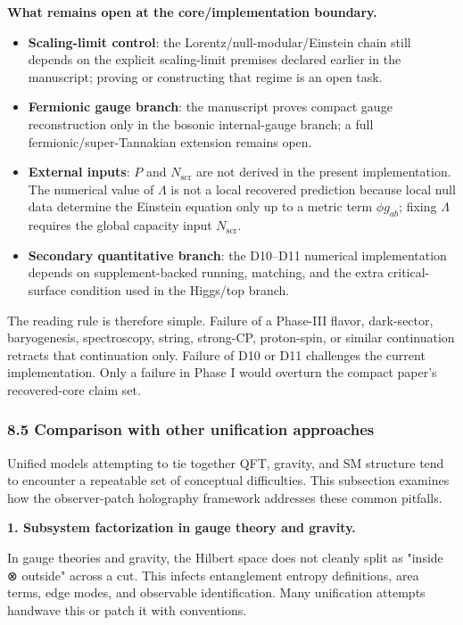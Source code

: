 \textbf{What remains open at the core/implementation boundary.}
\begin{itemize}
\item \textbf{Scaling-limit control}: the Lorentz/null-modular/Einstein chain still depends on the explicit scaling-limit premises declared earlier in the manuscript; proving or constructing that regime is an open task.
\item \textbf{Fermionic gauge branch}: the manuscript proves compact gauge reconstruction only in the bosonic internal-gauge branch; a full fermionic/super-Tannakian extension remains open.
\item \textbf{External inputs}: $P$ and $N_{\mathrm{scr}}$ are not derived in the present implementation. The numerical value of $\Lambda$ is not a local recovered prediction because local null data determine the Einstein equation only up to a metric term $\phi g_{ab}$; fixing $\Lambda$ requires the global capacity input $N_{\mathrm{scr}}$.
\item \textbf{Secondary quantitative branch}: the D10--D11 numerical implementation depends on supplement-backed running, matching, and the extra critical-surface condition used in the Higgs/top branch.
\end{itemize}

The reading rule is therefore simple. Failure of a Phase-III flavor, dark-sector, baryogenesis, spectroscopy, string, strong-CP, proton-spin, or similar continuation retracts that continuation only. Failure of D10 or D11 challenges the current implementation. Only a failure in Phase I would overturn the compact paper's recovered-core claim set.

\subsubsection{8.5 Comparison with other unification approaches}\label{85-comparison-with-other-unification-approaches}

Unified models attempting to tie together QFT, gravity, and SM structure tend to encounter a repeatable set of conceptual difficulties. This subsection examines how the observer-patch holography framework addresses these common pitfalls.

\textbf{1. Subsystem factorization in gauge theory and gravity.}

In gauge theories and gravity, the Hilbert space does not cleanly split as "inside ⊗ outside" across a cut. This infects entanglement entropy definitions, area terms, edge modes, and observable identification. Many unification attempts handwave this or patch it with conventions.

